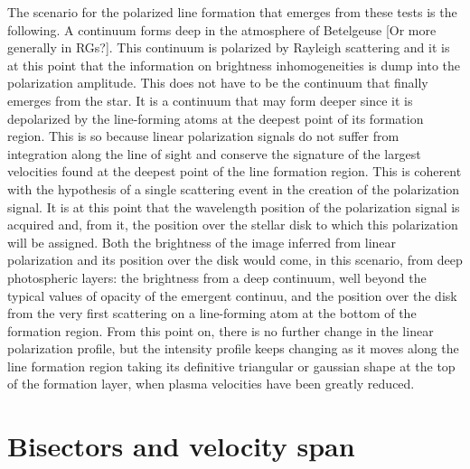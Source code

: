 \documentclass{/Users/art2/TeX/aanda/aa}
\begin{document}
The scenario for the polarized line formation that emerges from these tests is the following. A continuum forms deep in the atmosphere of Betelgeuse [Or more generally in RGs?]. This continuum is 
polarized by Rayleigh scattering and it is at this point that the information on brightness inhomogeneities is dump into the polarization amplitude. 
This does not have to be the continuum that finally emerges from the star. It is a continuum that may form deeper since it is depolarized by the line-forming atoms 
at the deepest point of its formation region. This is so because linear polarization signals do not suffer from integration along the line of sight and conserve 
the signature of the largest velocities found at the deepest point of the line formation region. This is coherent with the hypothesis of a single 
scattering event in the creation of the polarization signal. It is at this point that the wavelength position of the polarization signal is acquired and,
from it, the position over the stellar disk to which this polarization will be assigned. Both the brightness of the image inferred from linear polarization 
and its position over the disk would come, in this scenario, from deep photospheric layers: the brightness from a deep continuum, well beyond the 
typical values of opacity of the emergent continuu, and the position over the disk from the very first scattering on a line-forming atom at the bottom 
of the formation region.   From this point on, there is no further change in the linear polarization profile, but the intensity profile keeps changing 
as it moves along the line formation region taking its definitive triangular or gaussian shape at the top of the formation layer, when plasma velocities 
have been greatly reduced. 


\section{Bisectors and velocity span}
\end{document}
